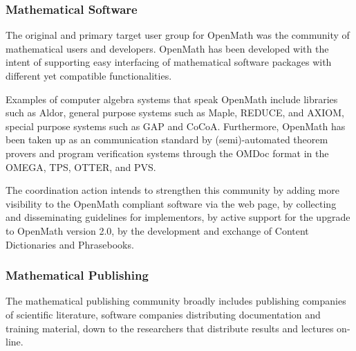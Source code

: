 \documentclass{euproposal}
\begin{document}



\subsubsection{Mathematical Software}\label{sec:msw}

The original and primary target user group for OpenMath was the
community of mathematical users and developers. OpenMath has been
developed with the intent of supporting easy interfacing of
mathematical software packages with different yet compatible
functionalities.

Examples of computer algebra systems that speak OpenMath include
libraries such as Aldor, general purpose systems such as Maple,
REDUCE, and AXIOM, special purpose systems such as GAP and CoCoA.
Furthermore, OpenMath has been taken up as an communication standard
by (semi)-automated theorem provers and program verification systems
through the OMDoc format in the OMEGA, TPS, OTTER, and PVS.

The coordination action intends to strengthen this community by adding
more visibility to the OpenMath compliant software via the web page,
by collecting and disseminating guidelines for implementors, by active
support for the upgrade to OpenMath version 2.0, by the development
and exchange of Content Dictionaries and Phrasebooks.





\subsubsection{Mathematical Publishing}\label{sec:mpubl}

The mathematical publishing community broadly includes publishing
companies of scientific literature, software companies distributing
documentation and training material, down to the researchers that
distribute results and lectures on-line.
\end{document}
